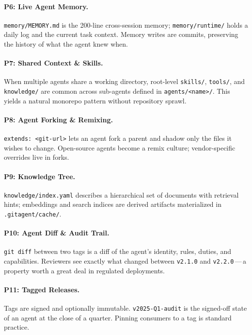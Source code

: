 \documentclass[11pt,a4paper]{article}
\begin{document}
\paragraph{P6: Live Agent Memory.}
\texttt{memory/MEMORY.md} is the 200-line cross-session memory; \texttt{memory/runtime/}
holds a daily log and the current task context. Memory writes are commits, preserving
the history of what the agent knew when.

\paragraph{P7: Shared Context \& Skills.}
When multiple agents share a working directory, root-level \texttt{skills/},
\texttt{tools/}, and \texttt{knowledge/} are common across sub-agents defined in
\texttt{agents/<name>/}. This yields a natural monorepo pattern without repository
sprawl.

\paragraph{P8: Agent Forking \& Remixing.}
\texttt{extends: <git-url>} lets an agent fork a parent and shadow only the files it
wishes to change. Open-source agents become a remix culture; vendor-specific overrides
live in forks.

\paragraph{P9: Knowledge Tree.}
\texttt{knowledge/index.yaml} describes a hierarchical set of documents with
retrieval hints; embeddings and search indices are derived artifacts
materialized in \texttt{.gitagent/cache/}.

\paragraph{P10: Agent Diff \& Audit Trail.}
\texttt{git diff} between two tags is a diff of the agent's identity, rules, duties,
and capabilities. Reviewers see exactly what changed between \texttt{v2.1.0} and
\texttt{v2.2.0}\,---\,a property worth a great deal in regulated deployments.

\paragraph{P11: Tagged Releases.}
Tags are signed and optionally immutable. \texttt{v2025-Q1-audit} is the signed-off
state of an agent at the close of a quarter. Pinning consumers to a tag is standard
practice.
\end{document}
